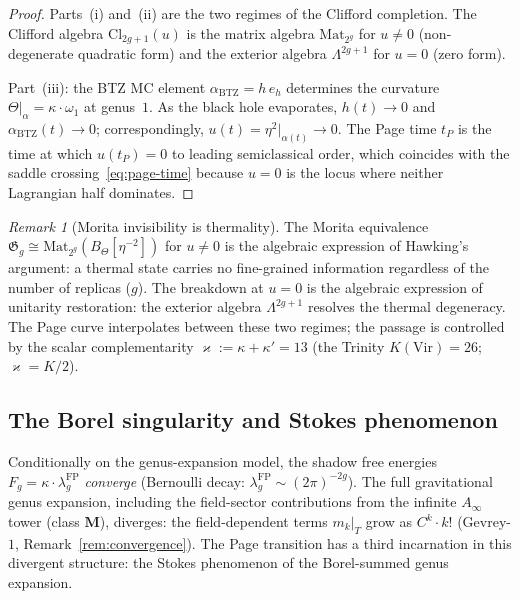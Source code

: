 \documentclass[11pt,reqno]{amsart}
\theoremstyle{definition}
\theoremstyle{remark}
\newtheorem{remark}[theorem]{Remark}
\providecommand{\Vir}{\mathrm{Vir}}
\begin{document}
\begin{proof}
Parts~(i) and~(ii) are the two regimes of the Clifford
completion. The Clifford algebra
$\mathrm{Cl}_{2g+1}(u)$ is the matrix algebra
$\mathrm{Mat}_{2^g}$ for $u \ne 0$ (non-degenerate quadratic
form) and the exterior algebra $\Lambda^{2g+1}$ for $u = 0$
(zero form).

Part~(iii): the BTZ MC element $\alpha_{\mathrm{BTZ}} = h\,e_h$
determines the curvature $\Theta|_{\alpha} = \kappa\cdot\omega_1$
at genus~$1$. As the black hole evaporates,
$h(t) \to 0$ and $\alpha_{\mathrm{BTZ}}(t) \to 0$;
correspondingly, $u(t) = \eta^2|_{\alpha(t)} \to 0$. The Page
time $t_P$ is the time at which $u(t_P) = 0$ to leading
semiclassical order, which coincides with the saddle
crossing~\eqref{eq:page-time} because $u = 0$ is the locus
where neither Lagrangian half dominates.
\end{proof}

\begin{remark}[Morita invisibility is thermality]
\label{rem:morita-unitarity}
The Morita equivalence
$\mathfrak{G}_g \cong \mathrm{Mat}_{2^g}(B_\Theta[\eta^{-2}])$
for $u \ne 0$ is the algebraic expression of Hawking's
argument: a thermal state carries no fine-grained information
regardless of the number of replicas ($g$). The breakdown at
$u = 0$ is the algebraic expression of unitarity restoration:
the exterior algebra $\Lambda^{2g+1}$ resolves the thermal
degeneracy. The Page curve interpolates between these two
regimes; the passage is controlled by the scalar complementarity
$\varkappa := \kappa + \kappa' = 13$ (the Trinity
$K(\Vir) = 26$; $\varkappa = K/2$).
\end{remark}

\subsection{The Borel singularity and Stokes phenomenon}

Conditionally on the genus-expansion model, the shadow free energies $F_g = \kappa \cdot
\lambda_g^{\mathrm{FP}}$ \emph{converge} (Bernoulli decay:
$\lambda_g^{\mathrm{FP}} \sim (2\pi)^{-2g}$). The full
gravitational genus expansion, including the field-sector
contributions from the infinite $A_\infty$ tower (class
$\mathbf{M}$), diverges: the field-dependent terms $m_k|_T$
grow as $C^k \cdot k!$ (Gevrey-$1$,
Remark~\ref{rem:convergence}). The Page transition has a
third incarnation in this divergent structure: the Stokes
phenomenon of the Borel-summed genus expansion.
\end{document}
